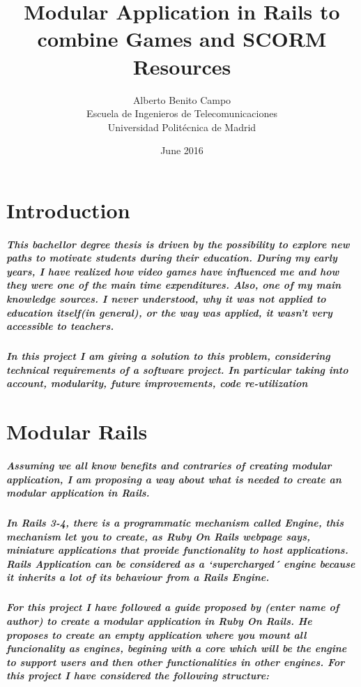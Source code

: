 \documentclass{book}
\title{Modular Application in Rails to combine Games and SCORM Resources}
\author{Alberto Benito Campo\\Escuela de Ingenieros de Telecomunicaciones\\Universidad Politécnica de Madrid}
\date{June 2016}
\begin{document}
\begin{titlepage}
\maketitle
\end{titlepage}

\chapter{Introduction}
\paragraph{This bachellor degree thesis is driven by the possibility to explore new paths to motivate students during their education. During my early years, I have realized how video games have influenced me and how they were one of the main time expenditures. Also, one of my main knowledge sources. I never understood, why it was not applied to education itself(in general), or the way was applied, it wasn't very accessible to teachers.}

\paragraph{In this project I am giving a solution to this problem, considering technical requirements of a software project. In particular taking into account, modularity, future improvements, code re-utilization}
\chapter{Modular Rails}

\paragraph{Assuming we all know benefits and contraries of creating modular application, I am proposing a way about what is needed to create an modular application in Rails.}
\paragraph{
	In Rails 3-4, there is a programmatic mechanism called Engine, this mechanism let you to create, as Ruby On Rails webpage says, miniature applications that provide functionality to host applications. Rails Application can be considered as a `supercharged´ engine because it inherits a lot of its behaviour from a Rails Engine.
}
\paragraph{For this project I have followed a guide proposed by (enter name of author) to create a modular application in Ruby On Rails. He proposes to create an empty application where you mount all funcionality as engines, begining with a core which will be the engine to support users and then other functionalities in other engines. For this project I have considered the following structure:}
\end{document}

